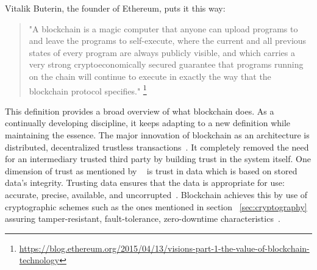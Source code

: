 Vitalik Buterin, the founder of Ethereum, puts it this way:  
\begin{quote}
	\centering
	"A blockchain is a magic computer that anyone can upload programs to and
	leave the programs to self-execute, where the current and all previous
	states of every program are always publicly visible, and which carries a
	very strong cryptoeconomically secured guarantee that programs running on
	the chain will continue to execute in exactly the way that the blockchain
	protocol specifies."
	\footnote{\url{https://blog.ethereum.org/2015/04/13/visions-part-1-the-value-of-blockchain-technology}} 
\end{quote}
This definition provides a broad overview of what blockchain does. As a
continually developing discipline, it keeps adapting to a new definition while
maintaining the essence. The major innovation of blockchain as an architecture
is distributed, decentralized trustless transactions~\cite{Bitcoin_Satoshi}. It
completely removed the need for an intermediary trusted third party by building
trust in the system itself. One dimension of trust as mentioned by
~\cite{miller2010trust} is trust in data which is based on stored data's
integrity. Trusting data ensures that the data is appropriate for use:
accurate, precise, available, and uncorrupted~\cite{miller2010trust}.
Blockchain achieves this by use of cryptographic schemes such as the ones
mentioned in section ~\ref{sec:cryptography} assuring tamper-resistant,
fault-tolerance, zero-downtime characteristics~\cite{swan2015blockchain}. 
\newpage

 
